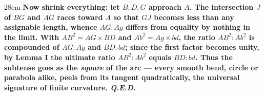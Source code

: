 \documentclass[border=4pt]{standalone}
\begin{document}
\begin{varwidth}{28em}
\large\bfseries
Now shrink everything: let $B,D,G$ approach $A$. The intersection $J$ of $BG$ and      $AG$ races toward $A$ so that $GJ$ becomes less than any assignable      length, whence $AG:Ag$ differs from equality by nothing in the limit. With      $AB^{2}=AG\times BD$ and $Ab^{2}=Ag\times bd$, the ratio $AB^{2}:Ab^{2}$      is compounded of $AG:Ag$ and $BD:bd$; since the first factor becomes unity, by      Lemma I the ultimate ratio $AB^{2}:Ab^{2}$ equals $BD:bd$. Thus the subtense      goes as the \textit{square} of the arc — every smooth bend, circle or      parabola alike, peels from its tangent quadratically, the universal      signature of finite curvature. \textit{Q.E.D.}
\end{varwidth}
\end{document}
